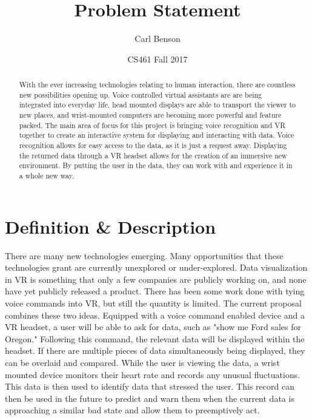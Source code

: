 \documentclass[onecolumn, draftclsnofoot,10pt, compsoc, letterpaper]{IEEEtran}
\title{Problem Statement}
\date{CS461 Fall 2017}
\author{Carl Benson}
\begin{document}
\begin{titlingpage}
    \maketitle
    \begin{abstract}
        With the ever increasing technologies relating to human interaction, there are countless new possibilities opening up. Voice controlled virtual assistants are are being integrated into everyday life, head mounted displays are able to transport the viewer to new places, and wrist-mounted computers are becoming more powerful and feature packed. The main area of focus for this project is bringing voice recognition and VR together to create an interactive system for displaying and interacting with data. Voice recognition allows for easy access to the data, as it is just a request away. Displaying the returned data through a VR headset allows for the creation of an immersive new environment. By putting the user in the data, they can work with and experience it in a whole new way.
    \end{abstract}
\end{titlingpage}
\section{Definition \& Description}
There are many new technologies emerging. Many opportunities that these technologies grant are currently unexplored or under-explored. Data visualization in VR is something that only a few companies are publicly working on, and none have yet publicly released a product. There has been some work done with tying voice commands into VR, but still the quantity is limited. The current proposal combines these two ideas. Equipped with a voice command enabled device and a VR headset, a user will be able to ask for data, such as "show me Ford sales for Oregon." Following this command, the relevant data will be displayed within the headset. If there are multiple pieces of data simultaneously being displayed, they can be overlaid and compared. While the user is viewing the data, a wrist mounted device monitors their heart rate and records any unusual fluctuations. This data is then used to identify data that stressed the user. This record can then be used in the future to predict and warn them when the current data is approaching a similar bad state and allow them to preemptively act.
\end{document}

